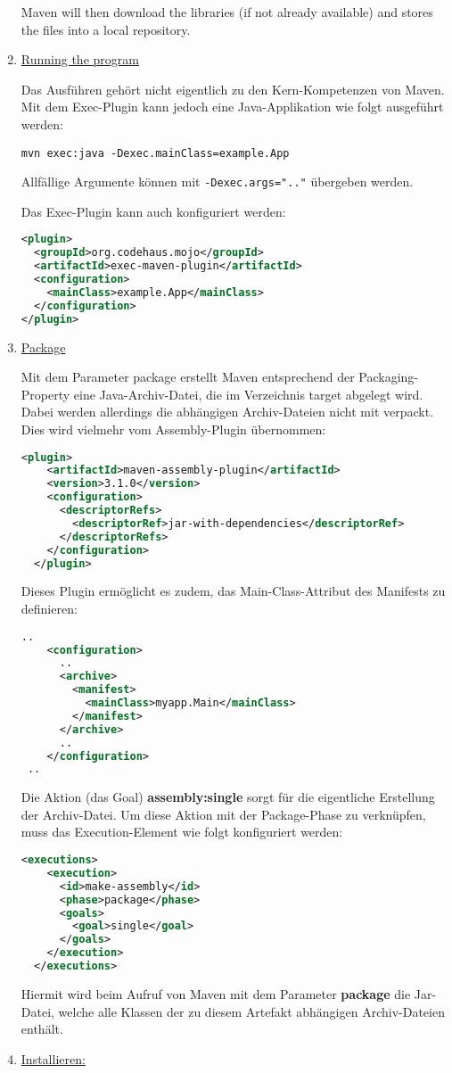 \begin{enumerate}
Maven will then download the libraries (if not already available) and
stores the files into a local repository.
%
\newslide
\item \underline{Running the program}

Das Ausführen gehört nicht eigentlich zu den Kern-Kompetenzen von
Maven. Mit dem Exec-Plugin kann jedoch eine Java-Applikation  wie
folgt ausgeführt werden:
\begin{lstlisting}
mvn exec:java -Dexec.mainClass=example.App
\end{lstlisting}
Allfällige Argumente können mit \verb+-Dexec.args=".."+ übergeben
werden.

Das Exec-Plugin kann auch konfiguriert werden:
\begin{lstlisting}[language=xml,
  morekeywords={plugin,groupId,artifactId,configuration,mainClass}]
<plugin>
  <groupId>org.codehaus.mojo</groupId>
  <artifactId>exec-maven-plugin</artifactId>
  <configuration>
    <mainClass>example.App</mainClass>
  </configuration>
</plugin>
\end{lstlisting}
\newslide

\item \underline{Package}

Mit dem Parameter package erstellt Maven entsprechend der
Packaging-Property eine Java-Archiv-Datei, die im Verzeichnis
target abgelegt wird. Dabei werden allerdings die abhängigen
Archiv-Dateien nicht mit verpackt. Dies wird vielmehr vom Assembly-Plugin
übernommen:
\begin{lstlisting}[language=xml,
  morekeywords={plugin,artifactId,configuration,descriptorRefs,
  descriptorRef}]
  <plugin>
    <artifactId>maven-assembly-plugin</artifactId>
    <version>3.1.0</version>
    <configuration>
      <descriptorRefs>
        <descriptorRef>jar-with-dependencies</descriptorRef>
      </descriptorRefs>
    </configuration>
  </plugin>
\end{lstlisting}
\newslide
Dieses Plugin ermöglicht es zudem, das Main-Class-Attribut
des Manifests zu definieren:
\begin{lstlisting}[language=xml,
morekeywords={configuration,archive,manifest,mainClass}]
..
    <configuration>
      ..
      <archive>
        <manifest>
          <mainClass>myapp.Main</mainClass>
        </manifest>
      </archive>
      ..
    </configuration>
 ..
\end{lstlisting}
Die Aktion (das Goal) {\bfseries assembly:single} sorgt
für die eigentliche Erstellung der Archiv-Datei.
Um diese Aktion
 mit der Package-Phase zu verknüpfen, muss das
Execution-Element wie folgt konfiguriert werden:
\begin{lstlisting}[language=xml,
  morekeywords={executions,execution,id,phase,goals,goal}]
  <executions>
    <execution>
      <id>make-assembly</id>
      <phase>package</phase>
      <goals>
        <goal>single</goal>
      </goals>
    </execution>
  </executions>
\end{lstlisting}
Hiermit wird beim Aufruf von Maven mit dem Parameter {\bfseries package} die
Jar-Datei, welche alle Klassen der zu diesem Artefakt abhängigen
Archiv-Dateien enthält.
%
\newslide
\item \underline{Installieren:}


\end{enumerate}
